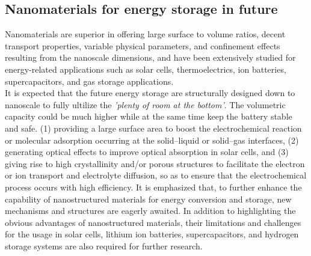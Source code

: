 \subsection{Nanomaterials for energy storage in future}
Nanomaterials are superior in offering large surface to volume ratios, decent transport properties, variable physical parameters, and confinement effects resulting from the nanoscale dimensions, and have been extensively studied for energy-related applications such as solar cells, thermoelectrics, ion batteries, supercapacitors, and gas storage applications.\\
It is expected that the future energy storage are structurally designed down to nanoscale to fully ultilize the {\em 'plenty of room at the bottom'}. The volumetric capacity could be much higher while at the same time keep the battery stable and safe. 
(1) providing a large surface area to boost the electrochemical reaction or molecular adsorption occurring at the solid–liquid or solid–gas interfaces, (2) generating optical effects to improve optical absorption in solar cells, and (3) giving rise to high crystallinity and/or porous structures to facilitate the electron or ion transport and electrolyte diffusion, so as to ensure that the electrochemical process occurs with high efficiency. It is emphasized that, to further enhance the capability of nanostructured materials for energy conversion and storage, new mechanisms and structures are eagerly awaited. In addition to highlighting the obvious advantages of nanostructured materials, their limitations and challenges for the usage in solar cells, lithium ion batteries, supercapacitors, and hydrogen storage systems are also required for further research.\cite{qifengzhang2013csr}\\





